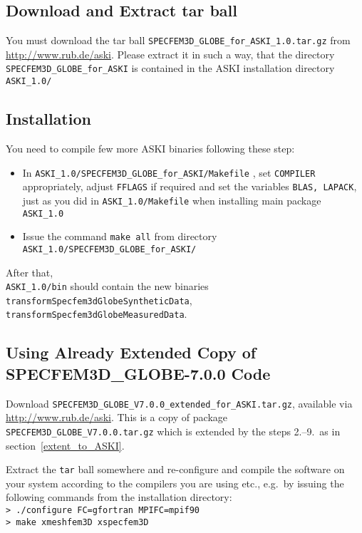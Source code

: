 \documentclass[12pt,a4paper]{article}
\newcommand{\lcode}[1]{\nolinkurl{#1}}
\newcommand{\lcodetitle}[1]{ {\ttfamily #1} }
\newcommand{\ASKI}{ {\ttfamily ASKI} }
\begin{document}
\subsection{Download and Extract \lcodetitle{tar} ball} %
You must download the tar ball
\lcode{SPECFEM3D_GLOBE_for_ASKI_1.0.tar.gz}
from \url{http://www.rub.de/aski}. Please extract it in such a way, that the directory 
\lcode{SPECFEM3D_GLOBE_for_ASKI} is contained in the \ASKI installation directory 
\lcode{ASKI_1.0/}

\subsection{Installation} %
You need to compile few more \ASKI binaries following these step:
\begin{itemize}
\item In \lcode{ASKI_1.0/SPECFEM3D_GLOBE_for_ASKI/Makefile} , set \lcode{COMPILER} appropriately, 
   adjust \lcode{FFLAGS} if required and set the variables \lcode{BLAS, LAPACK}, just as you did 
   in \lcode{ASKI_1.0/Makefile} when installing main package \lcode{ASKI_1.0}
\item 
 Issue the command \lcode{make all} from directory \lcode{ASKI_1.0/SPECFEM3D_GLOBE_for_ASKI/}
\end{itemize}
After that, \\\lcode{ASKI_1.0/bin} should contain the new binaries \lcode{transformSpecfem3dGlobeSyntheticData}, 
\lcode{transformSpecfem3dGlobeMeasuredData}.

\subsection{Using Already Extended Copy of \lcodetitle{SPECFEM3D\_GLOBE-7.0.0} Code} \label{use_modified_SPECFEM}
Download \lcode{SPECFEM3D_GLOBE_V7.0.0_extended_for_ASKI.tar.gz}, available via 
\url{http://www.rub.de/aski}. This is a copy of package \lcode{SPECFEM3D_GLOBE_V7.0.0.tar.gz} which is
extended by the steps 2.--9.\ as in section~\ref{extent_to_ASKI}{}.

Extract the \lcode{tar} ball somewhere and re-configure and compile the software on your system according 
to the compilers you are using etc., e.g.\ by issuing the following commands from the installation directory:\\
\lcode{> ./configure FC=gfortran MPIFC=mpif90}\\
\lcode{> make xmeshfem3D xspecfem3D}
\end{document}

